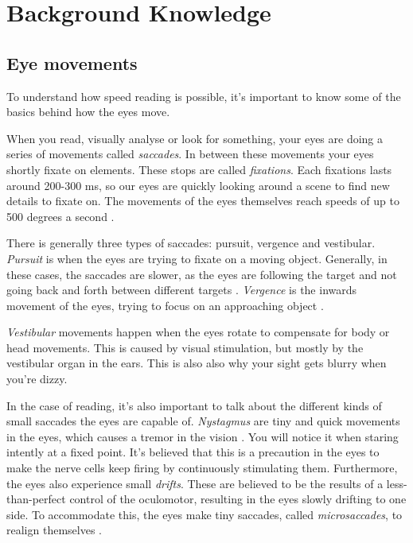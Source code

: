 \section{Background Knowledge}

\subsection{Eye movements}\label{eye}
To understand how speed reading is possible, it's important to know some of the basics behind how the eyes move.

When you read, visually analyse or look for something, your eyes are doing a series of movements called \textit{saccades}. In between these movements your eyes shortly fixate on elements. These stops are called \textit{fixations}. Each fixations lasts around 200-300 ms, so our eyes are quickly looking around a scene to find new details to fixate on. The movements of the eyes themselves reach speeds of up to 500 degrees a second \cite{eyeMovement}.

There is generally three types of saccades: pursuit, vergence and vestibular. \textit{Pursuit} is when the eyes are trying to fixate on a moving object. Generally, in these cases, the saccades are slower, as the eyes are following the target and not going back and forth between different targets \cite{eyeMovement}.
\textit{Vergence} is the inwards movement of the eyes, trying to focus on an approaching object \cite{eyeMovement}.

\textit{Vestibular} movements happen when the eyes rotate to compensate for body or head movements. This is caused by visual stimulation, but mostly by the vestibular organ in the ears. This is also also why your sight gets blurry when you're dizzy.

In the case of reading, it's also important to talk about the different kinds of small saccades the eyes are capable of. \textit{Nystagmus} are tiny and quick movements in the eyes, which causes a tremor in the vision \cite{eyeMovement}. You will notice it when staring intently at a fixed point. It's believed that this is a precaution in the eyes to make the nerve cells keep firing by continuously stimulating them. Furthermore, the eyes also experience small \textit{drifts}. These are believed to be the results of a less-than-perfect control of the oculomotor, resulting in the eyes slowly drifting to one side. To accommodate this, the eyes make tiny saccades, called \textit{microsaccades}, to realign themselves \cite{eyeMovement}.

